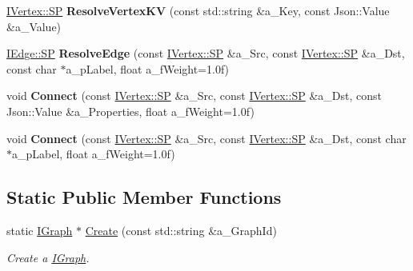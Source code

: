 \begin{DoxyCompactItemize}
\hyperlink{class_i_graph_1_1_i_vertex_af72b9df91f110bc7824c608c10cc819c}{I\+Vertex\+::\+SP} {\bfseries Resolve\+Vertex\+KV} (const std\+::string \&a\+\_\+\+Key, const Json\+::\+Value \&a\+\_\+\+Value)
\item 
\mbox{\label{class_i_graph_a7fa02b2d97a2825db64927794efacaca}} 
\hyperlink{class_i_graph_1_1_i_edge_adfae3ec3e377543685a06b9c5d5a776a}{I\+Edge\+::\+SP} {\bfseries Resolve\+Edge} (const \hyperlink{class_i_graph_1_1_i_vertex_af72b9df91f110bc7824c608c10cc819c}{I\+Vertex\+::\+SP} \&a\+\_\+\+Src, const \hyperlink{class_i_graph_1_1_i_vertex_af72b9df91f110bc7824c608c10cc819c}{I\+Vertex\+::\+SP} \&a\+\_\+\+Dst, const char $\ast$a\+\_\+p\+Label, float a\+\_\+f\+Weight=1.\+0f)
\item 
\mbox{\label{class_i_graph_a9d222dd961641657027f7e8465f170e8}} 
void {\bfseries Connect} (const \hyperlink{class_i_graph_1_1_i_vertex_af72b9df91f110bc7824c608c10cc819c}{I\+Vertex\+::\+SP} \&a\+\_\+\+Src, const \hyperlink{class_i_graph_1_1_i_vertex_af72b9df91f110bc7824c608c10cc819c}{I\+Vertex\+::\+SP} \&a\+\_\+\+Dst, const Json\+::\+Value \&a\+\_\+\+Properties, float a\+\_\+f\+Weight=1.\+0f)
\item 
\mbox{\label{class_i_graph_ad7c3b89bac4660af49341b6b3cdfb81e}} 
void {\bfseries Connect} (const \hyperlink{class_i_graph_1_1_i_vertex_af72b9df91f110bc7824c608c10cc819c}{I\+Vertex\+::\+SP} \&a\+\_\+\+Src, const \hyperlink{class_i_graph_1_1_i_vertex_af72b9df91f110bc7824c608c10cc819c}{I\+Vertex\+::\+SP} \&a\+\_\+\+Dst, const char $\ast$a\+\_\+p\+Label, float a\+\_\+f\+Weight=1.\+0f)
\end{DoxyCompactItemize}
\subsection*{Static Public Member Functions}
\begin{DoxyCompactItemize}
\item 
\mbox{\label{class_i_graph_a595f03d10242793fbbbf89db34ce8f05}} 
static \hyperlink{class_i_graph}{I\+Graph} $\ast$ \hyperlink{class_i_graph_a595f03d10242793fbbbf89db34ce8f05}{Create} (const std\+::string \&a\+\_\+\+Graph\+Id)
\begin{DoxyCompactList}\small\item\em Create a \hyperlink{class_i_graph}{I\+Graph}. \end{DoxyCompactList}\end{DoxyCompactItemize}
